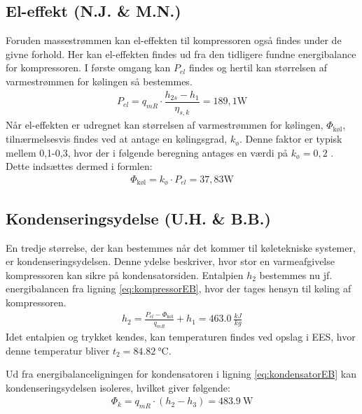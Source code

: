 \documentclass[../Hovedrapport.tex]{subfiles}
\begin{document}
\subsection{El-effekt (N.J. \& M.N.)}
    \label{sec:eleffektudre}
Foruden massestrømmen kan el-effekten til kompressoren også findes under de givne forhold. Her kan el-effekten findes ud fra den tidligere fundne energibalance for kompressoren. I første omgang kan $P_{el}$ findes og hertil kan størrelsen af varmestrømmen for kølingen så bestemmes. 
\begin{align}
    P_{el}=q_{mR} \cdot \dfrac{h_{2s}-h_1}{\eta_{s,k}}=189,1 \si{\watt}
\end{align}
Når el-effekten er udregnet kan størrelsen af varmestrømmen for kølingen, $\Phi_{\text{køl}}$, tilnærmelsesvis findes ved at antage en kølingsgrad, $k_{\textit{ø}}$. Denne faktor er typisk mellem 0,1-0,3, hvor der i følgende beregning antages en værdi på $k_{\textit{ø}}=0,2$ \citep{termo}. Dette indsættes dermed i formlen:
\begin{align}
    \Phi_{\text{køl}}= k_{\textit{ø}} \cdot P_{el} = 37,83 \si{\watt}
\end{align}
\subsection{Kondenseringsydelse (U.H. \& B.B.)}
    \label{sec:kondenseringsydelse_med_koling}
En tredje størrelse, der kan bestemmes når det kommer til køletekniske systemer, er kondenseringsydelsen. Denne ydelse beskriver, hvor stor en varmeafgivelse kompressoren kan sikre på kondensatorsiden. Entalpien $h_2$ bestemmes nu jf. energibalancen fra ligning \ref{eq:kompressorEB}, hvor der tages hensyn til køling af kompressoren.
\begin{align}
    h_2 = \frac{P_{el}-\Phi_{\text{køl}}}{q_{mR}}+h_1= \SI{463,0}{\frac{kJ}{kg}} 
\end{align}
Idet entalpien og trykket kendes, kan temperaturen findes ved opslag i EES, hvor denne temperatur bliver $t_2=\SI{84,82}{\celsius}$.

Ud fra energibalanceligningen for kondensatoren i ligning \ref{eq:kondensatorEB} kan kondenseringsydelsen isoleres, hvilket giver følgende:
\begin{align}
    \Phi_k=q_{mR}\cdot(h_2-h_3)=\SI{483,9}{\watt}
    \label{eq:kondenseringsydelse_udregnet}
\end{align}
\end{document}
